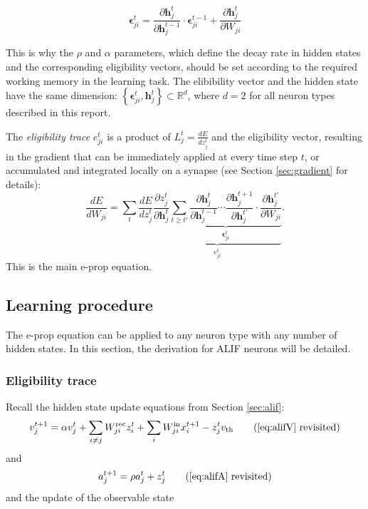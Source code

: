         \begin{equation}
        \mathbf{\epsilon}^t_{ji} = \frac{\partial\mathbf{h}_j^{t}}{\partial\mathbf{h}_j^{t-1}}\cdot\mathbf{\epsilon}^{t-1}_{ji} + \frac{\partial\mathbf{h}^t_j}{\partial W_{ji}}
        \end{equation}

        This is why the $\rho$ and $\alpha$ parameters, which define the decay rate in hidden states and the corresponding eligibility vectors, should be set according to the required working memory in the learning task.
        The elibibility vector and the hidden state have the same dimension: $\left\{\mathbf{\epsilon}^t_{ji}, \mathbf{h}^t_j\right\} \subset \mathbb{R}^d$, where $d=2$ for all neuron types described in this report.

        The \emph{eligibility trace} $e^t_{ji}$ is a product of $L^t_j = \frac{dE}{dz_j^t}$ and the eligibility vector, resulting in the gradient that can be immediately applied at every time step $t$, or accumulated and integrated locally on a synapse (see Section \ref{sec:gradient} for details):
        \begin{equation}
        \frac{dE}{dW_{ji}} = \sum_t\frac{dE}{dz_j^t}\underbrace{\frac{\partial z_j^t}{\partial\mathbf{h}_j^t}\underbrace{\sum_{t\geq t'}\frac{\partial\mathbf{h}^t_j}{\partial\mathbf{h}_j^{t-1}} \cdots \frac{\partial\mathbf{h}_j^{t+1}}{\partial\mathbf{h}_j^{t'}}\cdot\frac{\partial\mathbf{h}_j^{t'}}{\partial W_{ji}}}_{\mathbf{\epsilon}_{ji}^t}}_{e^t_{ji}}.
        \end{equation}
        This is the main e-prop equation.

    \subsection{Learning procedure}

        The e-prop equation can be applied to any neuron type with any number of hidden states.
        In this section, the derivation for ALIF neurons will be detailed.

        \subsubsection{Eligibility trace}
        Recall the hidden state update equations from Section \ref{sec:alif}:
        \begin{equation*}
        v^{t+1}_j = \alpha v_j^t + \sum_{i\neq j}W^\text{rec}_{ji}z_i^t + \sum_i W^\text{in}_{ji}x_i^{t+1} - z_j^tv_
        \text{th} \tag{\ref{eq:alifV} revisited}
        \end{equation*}
        and
        \begin{equation*}
        a^{t+1}_j = \rho a^t_j + z^t_j \tag{\ref{eq:alifA} revisited}
        \end{equation*}
        and the update of the observable state

